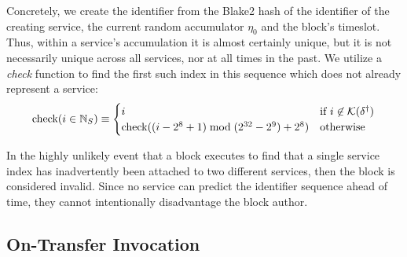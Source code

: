 Concretely, we create the identifier from the Blake2 hash of the identifier of the creating service, the current random accumulator $\eta_0$ and the block's timeslot. Thus, within a service's accumulation it is almost certainly unique, but it is not necessarily unique across all services, nor at all times in the past. We utilize a \emph{check} function to find the first such index in this sequence which does not already represent a service:
\begin{equation}
  \text{check}(i \in \mathbb{N}_S) \equiv \begin{cases}
    i &\text{if } i \not\in \mathcal{K}(\delta^\dagger)\\
    \text{check}((i - 2^8 + 1) \bmod (2^{32}-2^9) + 2^8)&\text{otherwise}
  \end{cases}
\end{equation}

\nb In the highly unlikely event that a block executes to find that a single service index has inadvertently been attached to two different services, then the block is considered invalid. Since no service can predict the identifier sequence ahead of time, they cannot intentionally disadvantage the block author.

\subsection{On-Transfer Invocation}\label{sec:ontransferinvocation}

